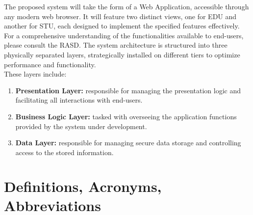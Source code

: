 The proposed system will take the form of a Web Application, accessible through any modern web browser. 
It will feature two distinct views, one for EDU and another for STU, each designed to implement the specified features effectively.
For a comprehensive understanding of the functionalities available to end-users, please consult the RASD.
The system architecture is structured into three physically separated layers, strategically installed on different tiers to optimize performance and functionality. \\
These layers include:
\begin{enumerate}
    \item \textbf{Presentation Layer:} responsible for managing the presentation logic and facilitating all interactions with end-users.
    \item \textbf{Business Logic Layer:} tasked with overseeing the application functions provided by the system under development.
    \item \textbf{Data Layer:} responsible for managing secure data storage and controlling access to the stored information.
\end{enumerate} 

\section{Definitions, Acronyms, Abbreviations}
